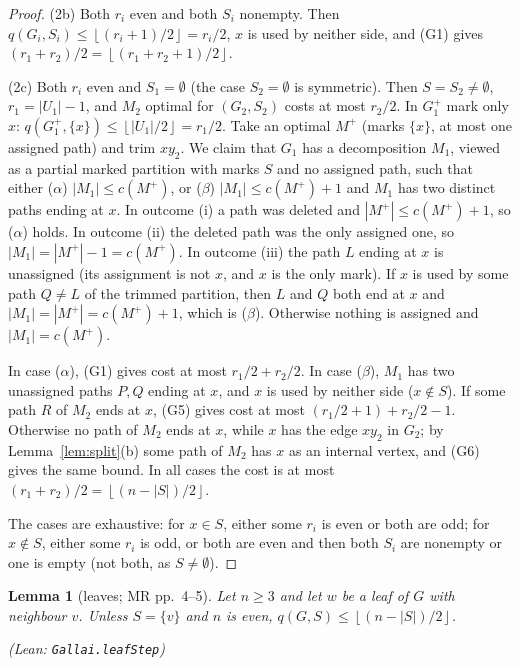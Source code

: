 \documentclass[11pt]{amsart}
\newtheorem{lemma}[theorem]{Lemma}
\theoremstyle{definition}
\theoremstyle{remark}
\renewcommand{\_}{\oldunderscore\allowbreak}
\newcommand{\leanst}[1]{\par{\raggedright\small\textup{(Lean: \texttt{#1})}\par}}
\newcommand{\fl}[1]{\left\lfloor #1\right\rfloor}
\begin{document}
\begin{proof}
(2b) Both $r_i$ even and both $S_i$ nonempty. Then $q(G_i,S_i)\le\fl{(r_i+1)/2}=r_i/2$, $x$ is used
by neither side, and (G1) gives $(r_1+r_2)/2=\fl{(r_1+r_2+1)/2}$.

(2c) Both $r_i$ even and $S_1=\emptyset$ (the case $S_2=\emptyset$ is symmetric). Then $S=S_2\ne\emptyset$,
$r_1=|U_1|-1$, and $M_2$ optimal for $(G_2,S_2)$ costs at most $r_2/2$. In $G_1^+$ mark only $x$:
$q(G_1^+,\{x\})\le\fl{|U_1|/2}=r_1/2$. Take an optimal $M^+$ (marks $\{x\}$, at most one assigned
path) and trim $xy_2$. We claim that $G_1$ has a decomposition $M_1$, viewed as a partial marked
partition with marks $S$ and no assigned path, such that either
($\alpha$) $|M_1|\le c(M^+)$, or
($\beta$) $|M_1|\le c(M^+)+1$ and $M_1$ has two distinct paths ending at $x$.
In outcome (i) a path was deleted and $|M^+|\le c(M^+)+1$, so ($\alpha$) holds. In outcome (ii) the
deleted path was the only assigned one, so $|M_1|=|M^+|-1=c(M^+)$. In outcome (iii) the path $L$
ending at $x$ is unassigned (its assignment is not $x$, and $x$ is the only mark). If $x$ is used by
some path $Q\ne L$ of the trimmed partition, then $L$ and $Q$ both end at $x$ and
$|M_1|=|M^+|=c(M^+)+1$, which is ($\beta$). Otherwise nothing is assigned and $|M_1|=c(M^+)$.

In case ($\alpha$), (G1) gives cost at most $r_1/2+r_2/2$. In case ($\beta$), $M_1$ has two
unassigned paths $P,Q$ ending at $x$, and $x$ is used by neither side ($x\notin S$). If some path $R$
of $M_2$ ends at $x$, (G5) gives cost at most $(r_1/2+1)+r_2/2-1$. Otherwise no path of $M_2$ ends at
$x$, while $x$ has the edge $xy_2$ in $G_2$; by Lemma~\ref{lem:split}(b) some path of $M_2$ has $x$
as an internal vertex, and (G6) gives the same bound. In all cases the cost is at most
$(r_1+r_2)/2=\fl{(n-|S|)/2}$.

The cases are exhaustive: for $x\in S$, either some $r_i$ is even or both are odd; for $x\notin S$,
either some $r_i$ is odd, or both are even and then both $S_i$ are nonempty or one is empty (not
both, as $S\ne\emptyset$).
\end{proof}

\begin{lemma}[leaves; MR pp.~4--5]\label{lem:leafstep}
Let $n\ge3$ and let $w$ be a leaf of $G$ with neighbour $v$. Unless $S=\{v\}$ and $n$ is even,
$q(G,S)\le\fl{(n-|S|)/2}$.
\leanst{Gallai.leafStep}
\end{lemma}
\end{document}
